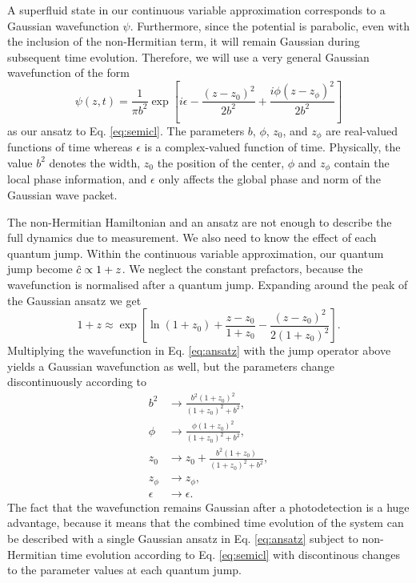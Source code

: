 A superfluid state in our continuous variable approximation
corresponds to a Gaussian wavefunction $\psi$. Furthermore, since the
potential is parabolic, even with the inclusion of the non-Hermitian
term, it will remain Gaussian during subsequent time
evolution. Therefore, we will use a very general Gaussian wavefunction
of the form
\begin{equation}
  \label{eq:ansatz}
  \psi(z, t) = \frac{1}{\pi b^2}\exp\left[ i \epsilon 
  - \frac{(z - z_0)^2} {2 b^2} + \frac{i \phi (z - z_\phi)^2} {2 b^2} \right]
\end{equation}
as our ansatz to Eq. \eqref{eq:semicl}. The parameters $b$, $\phi$,
$z_0$, and $z_\phi$ are real-valued functions of time whereas
$\epsilon$ is a complex-valued function of time. Physically, the value
$b^2$ denotes the width, $z_0$ the position of the center, $\phi$ and
$z_\phi$ contain the local phase information, and $\epsilon$ only
affects the global phase and norm of the Gaussian wave packet.

The non-Hermitian Hamiltonian and an ansatz are not enough to describe
the full dynamics due to measurement. We also need to know the effect
of each quantum jump. Within the continuous variable approximation,
our quantum jump become $\hat{c} \propto 1 + z$. We neglect the constant
prefactors, because the wavefunction is normalised after a quantum
jump. Expanding around the peak of the Gaussian ansatz we get
\begin{equation}
  1 + z \approx \exp \left[ \ln (1 + z_0) + \frac{z - z_0}{1 + z_0} -
    \frac{(z - z_0)^2}{2 (1 + z_0)^2} \right].
\end{equation}
Multiplying the wavefunction in Eq. \eqref{eq:ansatz} with the jump
operator above yields a Gaussian wavefunction as well, but the
parameters change discontinuously according to
\begin{align}
  \label{eq:jumpb2}
  b^2 & \rightarrow \frac{ b^2 (1 + z_0)^2 } { (1 + z_0)^2 + b^2 }, \\
  \phi & \rightarrow \frac{ \phi (1 + z_0)^2 } { (1 + z_0)^2 + b^2 }, \\
  \label{eq:jumpz0}
  z_0 & \rightarrow z_0 + \frac{ b^2 (1 + z_0) } { (1 + z_0)^2 + b^2}, \\
  z_\phi & \rightarrow z_\phi, \\
  \epsilon & \rightarrow \epsilon.
\end{align}
The fact that the wavefunction remains Gaussian after a photodetection
is a huge advantage, because it means that the combined time evolution
of the system can be described with a single Gaussian ansatz in
Eq. \eqref{eq:ansatz} subject to non-Hermitian time evolution
according to Eq. \eqref{eq:semicl} with discontinous changes to the
parameter values at each quantum jump.

